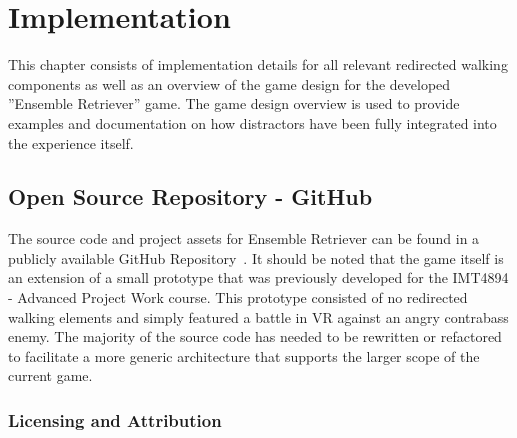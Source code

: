 \chapter{Implementation}
\label{chap:implementation}
This chapter consists of implementation details for all relevant redirected walking components as well as an overview of the game design for the developed ''Ensemble Retriever'' game. The game design overview is used to provide examples and documentation on how distractors have been fully integrated into the experience itself. 

\section{Open Source Repository - GitHub}
The source code and project assets for Ensemble Retriever can be found in a publicly available GitHub Repository~\cite{projectRepository}. It should be noted that the game itself is an extension of a small prototype that was previously developed for the IMT4894 - Advanced Project Work course. This prototype consisted of no redirected walking elements and simply featured a battle in VR against an angry contrabass enemy. The majority of the source code has needed to be rewritten or refactored to facilitate a more generic architecture that supports the larger scope of the current game.  
\subsection{Licensing and Attribution}

